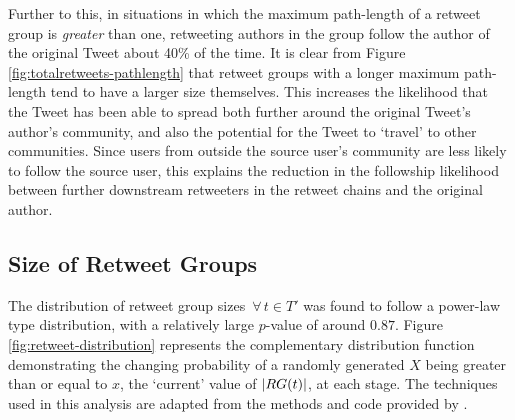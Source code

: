 Further to this, in situations in which the maximum path-length of a retweet group is \textit{greater} than one, retweeting authors in the group follow the author of the original Tweet about 40\% of the time. It is clear from Figure \ref{fig:totalretweets-pathlength} that retweet groups with a longer maximum path-length tend to have a larger size themselves. This increases the likelihood that the Tweet has been able to spread both further around the original Tweet's author's community, and also the potential for the Tweet to `travel' to other communities. Since users from outside the source user's community are less likely to follow the source user, this explains the reduction in the followship likelihood between further downstream retweeters in the retweet chains and the original author.


\subsection{Size of Retweet Groups}
The distribution of retweet group sizes $\, \forall \, t \in T'$  was found to follow a power-law type distribution, with a relatively large $p$-value of around $0.87$. Figure \ref{fig:retweet-distribution} represents the complementary distribution function demonstrating the changing probability of a randomly generated $X$ being greater than or equal to $x$, the `current' value of $|RG(t)|$, at each stage. The techniques used in this analysis are adapted from the methods and code provided by \citet{clauset07}.

